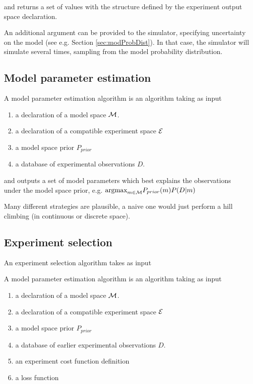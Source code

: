 \documentclass{article}
\begin{document}
and returns a set of values with the structure defined by the experiment output space declaration.


An additional argument can be provided to the simulator, specifying uncertainty on the model (see e.g. Section \ref{sec:modProbDist}).  In that case, the simulator will simulate several times, sampling from the model probability distribution.  


\subsection{Model parameter estimation}

A model parameter estimation algorithm is an algorithm taking as input
\begin{enumerate}
\item a declaration of a model space $\mathcal{M}$.
\item a declaration of a compatible experiment space $\mathcal{E}$
\item a model space prior $P_{prior}$
\item a database of experimental observations $D$.
\end{enumerate}

and outputs a set of model parameters which best explains the observations under the model space prior, e.g.
$\hbox{argmax}_{m\in\mathcal{M}} P_{prior}(m)P(D|m)$

Many different strategies are plausible, a naive one would just perform a hill climbing (in continuous or discrete space).



\subsection{Experiment selection}

An experiment selection algorithm takes as input


A model parameter estimation algorithm is an algorithm taking as input
\begin{enumerate}
\item a declaration of a model space $\mathcal{M}$.
\item a declaration of a compatible experiment space $\mathcal{E}$
\item a model space prior $P_{prior}$
\item a database of earlier experimental observations $D$.
\item an experiment cost function definition
\item a loss function
\end{enumerate}
\end{document}
